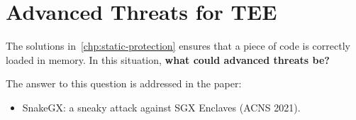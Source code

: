 \chapter{Advanced Threats for TEE}
\label{chp:advanced-threats} 

The solutions in~\ref{chp:static-protection} ensures that a piece of code is
correctly loaded in memory. 
In this situation, \textbf{what could advanced threats be?}


The answer to this question is addressed in the paper:
\begin{itemize}
	\item SnakeGX: a sneaky attack against SGX Enclaves (ACNS 2021).
\end{itemize}